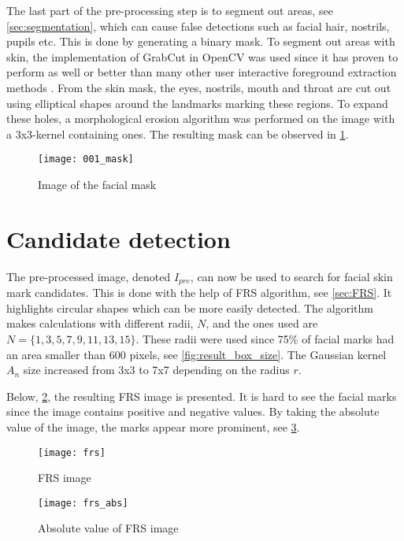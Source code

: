 The last part of the pre-processing step is to segment out areas, see \cref{sec:segmentation}, which can cause false detections such as facial hair, nostrils, pupils etc. This is done by generating a binary mask. To segment out areas with skin, the implementation of GrabCut in OpenCV was used since it has proven to perform as well or better than many other user interactive foreground extraction methods \cite{grabcut}. From the skin mask, the eyes, nostrils, mouth and throat are cut out using elliptical shapes around the landmarks marking these regions. To expand these holes, a morphological erosion algorithm was performed on the image with a 3x3-kernel containing ones. The resulting mask can be observed in \cref{fig:mask_img}. 

\FloatBarrier
\begin{figure}[!h]
	\centering
	\texttt{[image: 001\_mask]}
	\caption{Image of the facial mask \label{fig:mask_img}}
\end{figure}
\FloatBarrier        

\section{Candidate detection}

The pre-processed image, denoted $I_{pre}$, can now be used to search for facial skin mark candidates. This is done with the help of FRS algorithm, see \cref{sec:FRS}. It highlights circular shapes which can be more easily detected. The algorithm makes calculations with different radii, $N$, and the ones used are $N = \{1, 3, 5, 7, 9, 11, 13, 15 \}$. These radii were used since 75\% of facial marks had an area smaller than 600 pixels, see \cref{fig:result_box_size}. The Gaussian kernel $A_n$ size increased from 3x3 to 7x7 depending on the radius $r$. 

Below, \cref{fig:frs}, the resulting FRS image is presented. It is hard to see the facial marks since the image contains positive and negative values. By taking the absolute value of the image, the marks appear more prominent, see \cref{fig:frs_abs}.  

\FloatBarrier
\begin{figure}[h]
	\centering
	\texttt{[image: frs]}
	\caption{FRS image \label{fig:frs}}
\end{figure}
\FloatBarrier

\FloatBarrier
\begin{figure}[h]
	\centering
	\texttt{[image: frs\_abs]}
	\caption{Absolute value of FRS image \label{fig:frs_abs}}
\end{figure}
\FloatBarrier

